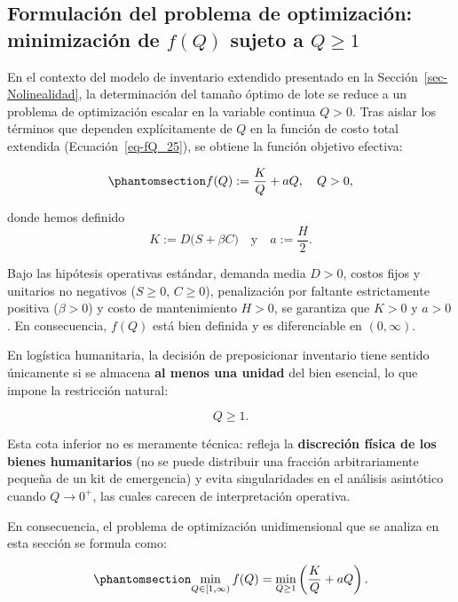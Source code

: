 \documentclass[
  spanish,
  us-letterpaper,
]{scrreprt}
\numberwithin{equation}{section}
\begin{document}
\subsection{\texorpdfstring{Formulación del problema de optimización:
minimización de \(f(Q)\) sujeto a
\(Q \geq 1\)}{Formulación del problema de optimización: minimización de f(Q) sujeto a Q \textbackslash geq 1}}\label{sec-formulacion}

En el contexto del modelo de inventario extendido presentado en la
Sección~\ref{sec-Nolinealidad}, la determinación del tamaño óptimo de
lote se reduce a un problema de optimización escalar en la variable
continua \(Q > 0\). Tras aislar los términos que dependen explícitamente
de \(Q\) en la función de costo total extendida
(Ecuación~\ref{eq-fQ_25}), se obtiene la función objetivo efectiva:

\begin{equation}\phantomsection\label{eq-fQ_25}{
f(Q) := \frac{K}{Q} + a Q, \quad Q > 0,
}\end{equation}

donde hemos definido\\
\[
K := D\bigl(S + \beta C\bigr) \quad \text{y} \quad a := \frac{H}{2}.
\]

Bajo las hipótesis operativas estándar, demanda media \(D > 0\), costos
fijos y unitarios no negativos (\(S \ge 0\), \(C \ge 0\)), penalización
por faltante estrictamente positiva (\(\beta > 0\)) y costo de
mantenimiento \(H > 0\), se garantiza que \(K > 0\) y \(a > 0\). En
consecuencia, \(f(Q)\) está bien definida y es diferenciable en
\((0, \infty)\).

En logística humanitaria, la decisión de preposicionar inventario tiene
sentido únicamente si se almacena \textbf{al menos una unidad} del bien
esencial, lo que impone la restricción natural:

\[
Q \geq 1.
\]

Esta cota inferior no es meramente técnica: refleja la
\textbf{discreción física de los bienes humanitarios} (no se puede
distribuir una fracción arbitrariamente pequeña de un kit de emergencia)
y evita singularidades en el análisis asintótico cuando \(Q \to 0^+\),
las cuales carecen de interpretación operativa.

En consecuencia, el problema de optimización unidimensional que se
analiza en esta sección se formula como:

\begin{equation}\phantomsection\label{eq-pou}{
\min_{Q \in [1, \infty)} f(Q) = \min_{Q \geq 1} \left( \frac{K}{Q} + a Q \right).
}\end{equation}
\end{document}
